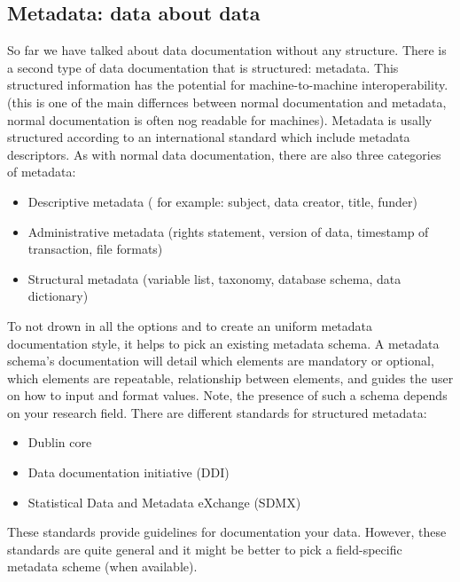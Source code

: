 \subsection{Metadata: data about data}
So far we have talked about data documentation without any structure. There is a second type of data documentation that is structured: metadata. This structured information has the potential for machine-to-machine interoperability. (this is one of the main differnces between normal documentation and metadata, normal documentation is often nog readable for machines).
\whiteline
Metadata is usally structured according to an international standard which include metadata descriptors. 
\whiteline
As with normal data documentation, there are also three categories of metadata:
\begin{itemize}
	\item Descriptive metadata ( for example: subject, data creator, title, funder)
	\item Administrative metadata (rights statement, version of data, timestamp of transaction, file formats)
	\item Structural metadata (variable list, taxonomy, database schema, data dictionary)
\end{itemize}
\whiteline
To not drown in all the options and to create an uniform metadata documentation style, it helps to pick an existing metadata schema. A metadata schema’s documentation will detail which elements are mandatory or optional, which elements are repeatable, relationship between elements, and guides the user on how to input and format values. Note, the presence of such a schema depends on your research field.
There are different standards for structured metadata:
\whiteline
\begin{itemize}
	\item Dublin core
	\item Data documentation initiative (DDI)
	\item Statistical Data and Metadata eXchange (SDMX)
\end{itemize}
\whiteline
These standards provide guidelines for documentation your data. However, these standards are quite general and it might be better to pick a field-specific metadata scheme (when available).




